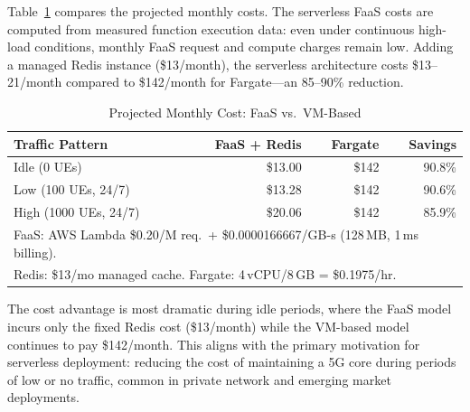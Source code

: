 Table~\ref{tab:cost} compares the projected monthly costs. The serverless FaaS costs are computed from measured function execution data: even under continuous high-load conditions, monthly FaaS request and compute charges remain low. Adding a managed Redis instance (\$13/month), the serverless architecture costs \$13--21/month compared to \$142/month for Fargate---an 85--90\% reduction.

\begin{table}[t]
\centering
\caption{Projected Monthly Cost: FaaS vs.\ VM-Based}
\label{tab:cost}
\footnotesize
\begin{tabular}{@{}lrrr@{}}
\toprule
\textbf{Traffic Pattern} & \textbf{FaaS + Redis} & \textbf{Fargate} & \textbf{Savings} \\
\midrule
Idle (0 UEs)              & \$13.00  & \$142  & 90.8\% \\
Low (100 UEs, 24/7)       & \$13.28  & \$142  & 90.6\% \\
High (1000 UEs, 24/7)     & \$20.06  & \$142  & 85.9\% \\
\bottomrule
\multicolumn{4}{l}{\scriptsize FaaS: AWS Lambda \$0.20/M req.\ + \$0.0000166667/GB-s (128\,MB, 1\,ms billing).} \\
\multicolumn{4}{l}{\scriptsize Redis: \$13/mo managed cache. Fargate: 4\,vCPU/8\,GB = \$0.1975/hr.}
\end{tabular}
\end{table}

The cost advantage is most dramatic during idle periods, where the FaaS model incurs only the fixed Redis cost (\$13/month) while the VM-based model continues to pay \$142/month. This aligns with the primary motivation for serverless deployment: reducing the cost of maintaining a 5G core during periods of low or no traffic, common in private network and emerging market deployments.

